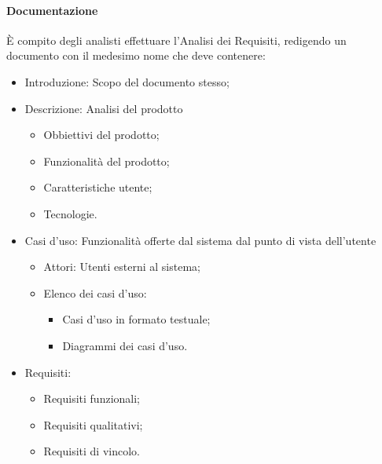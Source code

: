 \paragraph{Documentazione}
È compito degli analisti effettuare l'Analisi dei Requisiti, redigendo un documento con il
medesimo nome che deve contenere:
\begin{itemize}
    \item Introduzione: Scopo del documento stesso;
    \item Descrizione: Analisi del prodotto
          \begin{itemize}
              \item Obbiettivi del prodotto;
              \item Funzionalità del prodotto;
              \item Caratteristiche utente;
              \item Tecnologie.
          \end{itemize}
    \item  Casi d'uso: Funzionalità offerte dal sistema dal punto di vista dell'utente
        \begin{itemize}
            \item Attori: Utenti esterni al sistema;
            \item Elenco dei casi d'uso:
            \begin{itemize}
                \item Casi d'uso in formato testuale;
                \item Diagrammi dei casi d'uso.
            \end{itemize}  
        \end{itemize}
    \item Requisiti:
        \begin{itemize}
            \item Requisiti funzionali;
            \item Requisiti qualitativi;
            \item Requisiti di vincolo.
        \end{itemize}
\end{itemize}
